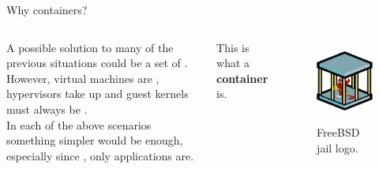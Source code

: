 \begin{frame}{Why containers?}
	\begin{columns}
		A possible solution to many of the previous situations could be a set of .\\
		However, virtual machines are , hypervisors take up  and guest kernels must always be .\\
		\bigskip
		In each of the above scenarios something simpler would be enough, especially since , only applications are.
		\begin{block}{}
			\centering
			This is what a \textbf{container} is.
		\end{block}

		\begin{figure}
			\centering
			\includegraphics[scale=.7]{freebsdjail.png}
			\label{fig:jail}
			\caption{FreeBSD jail logo.}
		\end{figure}
	\end{columns}
\end{frame}

